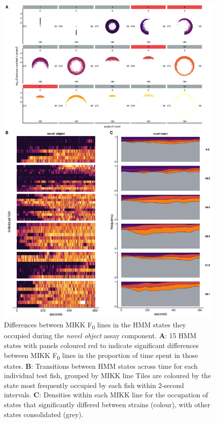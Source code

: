 \documentclass[
]{book}
\begin{document}
\begin{figure}
\includegraphics[width=1\linewidth]{figs/mikk_behaviour/select_0.08_15_sge_no} \caption{Differences between MIKK F\textsubscript{0} lines in the HMM states they occupied during the \emph{novel object} assay component. \textbf{A}: 15 HMM states with panels coloured red to indicate significant differences between MIKK F\textsubscript{0} lines in the proportion of time spent in those states. \textbf{B}: Transitions between HMM states across time for each individual test fish, grouped by MIKK line Tiles are coloured by the state most frequently occupied by each fish within 2-second intervals. \textbf{C}: Densities within each MIKK line for the occupation of states that significantly differed between strains (colour), with other states consolidated (grey).}\label{fig:F2-time-sge-no}
\end{figure}
\end{document}
